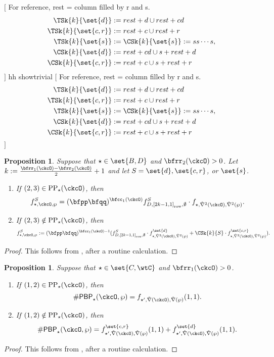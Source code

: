 \documentclass[12pt]{amsart}
\newcommand{\trivial}[2][]{\if\relax\detokenize{#1}\relax
  {%
      \color{orange} \vspace{0em}$[$#2$]$
      \color{black}
  }
  \else
\ifx#1h
\ifcsname showtrivial\endcsname
{%
    \color{orange}\vspace{0em}$[$#2$]$
    \color{black}
}
\fi
\else {\red Wrong argument!} \fi
\fi
}
\def\DD{\nabla}
\numberwithin{equation}{section}
\newtheorem{prop}[thm]{Proposition}
\theoremstyle{remark}
\def\DD{\nabla}
\def\CPPs{\mathrm{PP}_{\star}}
\def\PBP{\mathsf{PBP}}
\def\PBPop#1#2#3#4{\PBP_{#1}^{#2}(#3,#4)}
\newcommand{\PBPOP}[1][]{\PBPop{\star}{#1}{\ckcO}{\wp}}
\def\yrow#1{\left[#1\right]_{\mathrm{row}}}
\def\ckDD{{\check\DD}}
\def\DD{\nabla}
\begin{document}
\trivial[h]{
  For reference, rest = column filled by r and s.
\[
  \begin{split}
  \TSk{k}{\set{d}} &:=  rest + d\cup rest+cd \\
  \TSk{k}{\set{c,r}} &:= rest+c \cup rest+r\\
  \TSk{k}{\set{s}}& :=\CSk{k}{\set{s}} := ss\cdots s,\\
  \CSk{k}{\set{d}} &:= rest+cd \cup s+rest + d\\
  \CSk{k}{\set{c,r}} &:= rest+c \cup s+rest+r \\
  \end{split}
\]
}





\begin{prop}\label{prop:gf.BD}
  Suppose that $\star\in\set{B,D}$ and %
  $\bfrr_{2}(\ckcO)>0$. Let $k:=\frac{\bfrr_{1}(\ckcO)-\bfrr_{2}(\ckcO)}{2}+1$ and let $S = \set{d}, \set{c,r}$, or $ \set{s}$.

\begin{enumerate}[label=(\alph*),wide=0pt]
\item If $(2,3)\in \CPPs(\ckcO)$, then
    \[
      f_{\star,\ckcO, \wp}^{S} = (\bfpp\bfqq)^{\bfcc_{1}(\ckcO)}
      f_{D,\yrow{2k-1,1},\emptyset}^{S}
      \cdot  f_{\star,\ckDD^{2}(\ckcO),\ckDD^{2}(\wp)}.
    \]

\item  If $(2,3)\notin \CPPs(\ckcO)$,
    then
    \[
      f_{\star,\ckcO, \wp}^{S} := (\bfpp\bfqq)^{\bfcc_{1}(\ckcO)-1} (
      f_{D,\yrow{2k-1,1},\emptyset}^{S}
      \cdot f_{\star,\ckDD^{2}(\ckcO),\ckDD^{2}(\wp)}^{\set{d}}
      + \CSk{k}{S} \cdot f_{\star,\ckDD^{2}(\ckcO),\ckDD^{2}(\wp)}^{\set{c,r}}).
    \]
\end{enumerate}
\end{prop}
\begin{proof}
  This follows from , after a routine calculation.
\end{proof}


\begin{prop}\label{prop:gf.C}
  Suppose that $\star\in\set{C,\wtC}$ and %
  $\bfrr_{1}(\ckcO)>0$.
  \begin{enumerate}[label=(\alph*),wide=0pt]
    \item If $(1,2)\in \CPPs(\ckcO)$, then
    \[
      \# \PBPOP =  f_{\star',\ckDD(\ckcO), \ckDD(\wp)}(1,1).
    \]
    \item If $(1,2)\notin \CPPs(\ckcO)$,
    then
    \[
      \# \PBPOP = f_{\star',\ckDD(\ckcO), \ckDD(\wp)}^{\set{c,r}}(1,1) + f_{\star',\ckDD(\ckcO), \ckDD(\wp)}^{\set{d}}(1,1).
    \]
  \end{enumerate}

\end{prop}
\begin{proof}
  This follows from
  , after a routine calculation.
\end{proof}
\end{document}

